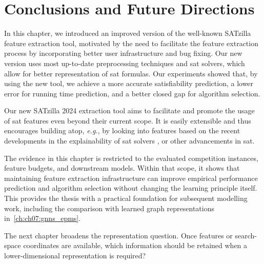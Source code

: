 \section{Conclusions and Future Directions}
\label{sec:ch04:conclusions}

In this chapter, we introduced an improved version of the well-known SATzilla feature extraction tool, motivated by the need to facilitate the feature extraction process by incorporating better user infrastructure and bug fixing. Our new version uses most up-to-date preprocessing techniques and \gls{sat} solvers, which allow for better representation of \gls{sat} formulas. Our experiments showed that, by using the new tool, we achieve a more accurate satisfiability prediction, a lower error for running time prediction, and a better closed gap for algorithm selection.

Our new SATzilla 2024 extraction tool aims to facilitate and promote the usage of \gls{sat} features even beyond their current scope. It is easily extensible and thus encourages building atop, \emph{e.g.}, by looking into features based on the recent developments in the explainability of \gls{sat} solvers \cite{ElfEtAl18}, or other advancements in \gls{sat}.

The evidence in this chapter is restricted to the evaluated competition instances, feature budgets, and downstream models. Within that scope, it shows that maintaining feature extraction infrastructure can improve empirical performance prediction and algorithm selection without changing the learning principle itself. This provides the thesis with a practical foundation for subsequent modelling work, including the comparison with learned graph representations in~\cref{ch:ch07:gnns_epms}.

The next chapter broadens the representation question. Once features or search-space coordinates are available, which information should be retained when a lower-dimensional representation is required?

